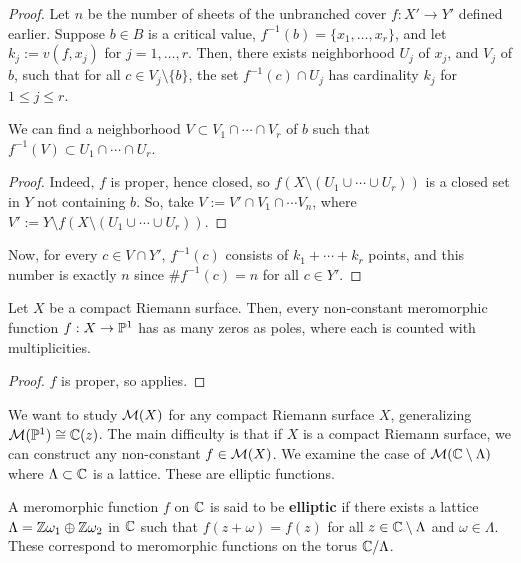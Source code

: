 \documentclass[11pt]{article}
\begin{document}
\begin{proof}
    Let $n$ be the number of sheets of the unbranched cover $f:X' \to Y'$ defined earlier. Suppose $b \in B$ is a critical value, $f^{-1}(b) = \{x_1,\dots,x_r\}$, and let $k_j:= v(f,x_j)$ for $j=1,\dots,r$. Then, there exists neighborhood $U_j$ of $x_j$, and $V_j$ of $b$, such that for all $c \in V_j\setminus \{b\}$, the set $f^{-1}(c) \cap U_j$ has cardinality $k_j$ for $1 \leq j \leq r$. 
    \begin{claim}
        We can find a neighborhood $V \subset V_1 \cap \cdots \cap V_r$ of $b$ such that $f^{-1}(V) \subset U_1 \cap \cdots \cap U_r$.
    \end{claim}
    \begin{proof}
        Indeed, $f$ is proper, hence closed, so $f(X \setminus (U_1 \cup \cdots \cup U_r))$ is a closed set in $Y$ not containing $b$. So, take $V:=V'\cap V_1 \cap \cdots V_n$, where $V' :=Y\setminus f(X\setminus(U_1 \cup \cdots \cup U_r)).$
    \end{proof}
    Now, for every $c \in V \cap Y'$, $f^{-1}(c)$ consists of $k_1 + \cdots + k_r$ points, and this number is exactly $n$ since $\#f^{-1}(c)=n$ for all $c \in Y'$.
\end{proof}


\begin{cor}
    Let $X$ be a compact Riemann surface. Then, every non-constant meromorphic function $f:X \to \P^1$ has as many zeros as poles, where each is counted with multiplicities.
\end{cor}

\begin{proof}
    $f$ is proper, so  applies.
\end{proof}

We want to study $\mc M(X)$ for any compact Riemann surface $X$, generalizing $\mc M(\P^1) \cong \C(z)$. The main difficulty is that if $X$ is a compact Riemann surface, we can construct any non-constant $f \in \mc M(X)$. We examine the case of $\mc M(\C\setminus \Lambda)$ where $\Lambda \subset \C$ is a lattice. These are elliptic functions.

\begin{defn}
    A meromorphic function $f$ on $\C$ is said to be \textbf{elliptic} if there exists a lattice $\Lambda =\Z\omega_1 \oplus  \Z\omega_2$ in $\C$ such that $f(z+\omega) = f(z)$ for all $z \in \C \setminus \Lambda$ and $\omega \in \Lambda$. These correspond to meromorphic functions on the torus $\C /\Lambda$.
\end{defn}
\end{document}
